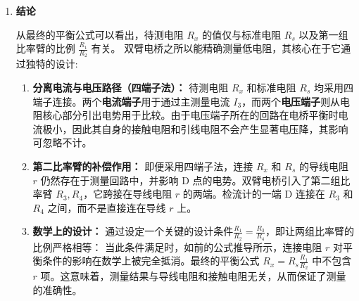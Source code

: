 \documentclass[]{../../templates/Report}%
\begin{document}
\begin{enumerate}[label=(\arabic*)]
\item \textbf{结论}

从最终的平衡公式可以看出，待测电阻 $R_x$ 的值仅与标准电阻 $R_s$ 以及第一组比率臂的比例 $\frac{R_1}{R_2}$ 有关。
双臂电桥之所以能精确测量低电阻，其核心在于它通过独特的设计:

\begin{enumerate}[label=\roman*.]
    \item \textbf{分离电流与电压路径（四端子法）：}
    待测电阻 $R_x$ 和标准电阻 $R_s$ 均采用四端子连接。两个\textbf{电流端子}用于通过主测量电流 $I_3$，而两个\textbf{电压端子}则从电阻核心部分引出电势用于比较。由于电压端子所在的回路在电桥平衡时电流极小，因此其自身的接触电阻和引线电阻不会产生显著电压降，其影响可忽略不计。

    \item \textbf{第二比率臂的补偿作用：}
    即便采用四端子法，连接 $R_x$ 和 $R_s$ 的导线电阻 $r$ 仍然存在于测量回路中，并影响 D 点的电势。双臂电桥引入了第二组比率臂 $R_3, R_4$，它跨接在导线电阻 $r$ 的两端。检流计的一端 D 连接在 $R_3$ 和 $R_4$ 之间，而不是直接连在导线 $r$ 上。

    \item \textbf{数学上的设计：}
    通过设定一个关键的设计条件$\frac{R_1}{R_2} = \frac{R_3}{R_4}$，即让两组比率臂的比例严格相等：
    当此条件满足时，如前的公式推导所示，连接电阻 $r$ 对平衡条件的影响在数学上被完全抵消。最终的平衡公式
    $ R_x = R_s \frac{R_1}{R_2} $
    中不包含 $r$ 项。这意味着，测量结果与导线电阻和接触电阻无关，从而保证了测量的准确性。
\end{enumerate}

\end{enumerate}
\end{document}
